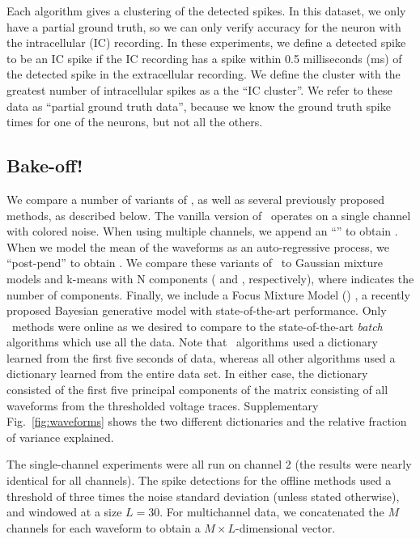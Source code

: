 Each algorithm gives a clustering of the detected spikes.  In this dataset, we only have a partial ground truth, so we can only verify accuracy for the neuron with the intracellular (IC) recording.  In these experiments, we define a detected spike to be an IC spike if the IC recording has a spike within 0.5 milliseconds (ms) of the detected spike in the extracellular recording.  We define the cluster with the greatest number of intracellular spikes as a the ``IC cluster''.   We refer to these data as ``partial ground truth data'', because we know the ground truth spike times for one of the neurons, but not all the others.  




\subsection{Bake-off!}

We compare a number of variants of \smug, as well as several previously proposed methods, as described below.  The vanilla version of \smug\ operates on a single channel with colored noise.  When using multiple channels, we append an ``'' to obtain \smug.  When we model the mean of the waveforms as an auto-regressive process, we ``post-pend'' to obtain \smug{}.  
We compare these variants of \smug\ to Gaussian mixture models and k-means with N components ( and , respectively), where  indicates the number of components.  Finally, we include a Focus Mixture Model () \cite{??}, a recently proposed Bayesian generative model with state-of-the-art performance.  Only \smug\ methods were online as we desired to compare to the state-of-the-art \emph{batch} algorithms which use all the data. 
Note that \smug\ algorithms used a dictionary learned from the first five seconds of data, whereas all other algorithms used a dictionary learned from the entire data set.  In either case, the dictionary consisted of the first five principal components of the matrix consisting of all waveforms from the thresholded voltage traces.  Supplementary Fig.\ \ref{fig:waveforms} shows the two different dictionaries and the relative fraction of variance explained.

% 
% 
The single-channel experiments were all run on channel 2 (the results were nearly identical for all channels).  The spike detections for the offline methods used a threshold of three times the noise standard deviation \cite{Lewicki} (unless stated otherwise), and windowed at a size $L=30$.  For multichannel data, we concatenated the $M$ channels for each waveform to obtain a $M\times L$-dimensional vector.

